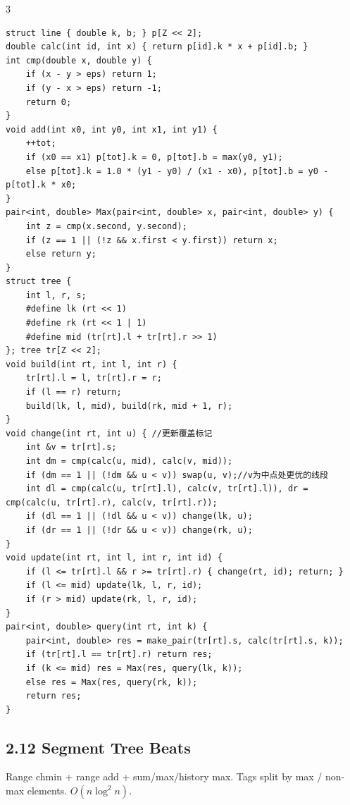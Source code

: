 \documentclass[8pt]{extarticle}
\begin{document}
\begin{multicols*}{3}
\begin{lstlisting}
struct line { double k, b; } p[Z << 2];
double calc(int id, int x) { return p[id].k * x + p[id].b; }
int cmp(double x, double y) {
    if (x - y > eps) return 1;
    if (y - x > eps) return -1;
    return 0;
}
void add(int x0, int y0, int x1, int y1) {
    ++tot;
    if (x0 == x1) p[tot].k = 0, p[tot].b = max(y0, y1);
    else p[tot].k = 1.0 * (y1 - y0) / (x1 - x0), p[tot].b = y0 - p[tot].k * x0;
}
pair<int, double> Max(pair<int, double> x, pair<int, double> y) {
    int z = cmp(x.second, y.second);
    if (z == 1 || (!z && x.first < y.first)) return x;
    else return y;
}
struct tree {
    int l, r, s;
    #define lk (rt << 1)
    #define rk (rt << 1 | 1)
    #define mid (tr[rt].l + tr[rt].r >> 1)
}; tree tr[Z << 2];
void build(int rt, int l, int r) {
    tr[rt].l = l, tr[rt].r = r;
    if (l == r) return;
    build(lk, l, mid), build(rk, mid + 1, r);
}
void change(int rt, int u) { //更新覆盖标记
    int &v = tr[rt].s;
    int dm = cmp(calc(u, mid), calc(v, mid));
    if (dm == 1 || (!dm && u < v)) swap(u, v);//v为中点处更优的线段
    int dl = cmp(calc(u, tr[rt].l), calc(v, tr[rt].l)), dr = cmp(calc(u, tr[rt].r), calc(v, tr[rt].r));
    if (dl == 1 || (!dl && u < v)) change(lk, u);
    if (dr == 1 || (!dr && u < v)) change(rk, u);
}
void update(int rt, int l, int r, int id) {
    if (l <= tr[rt].l && r >= tr[rt].r) { change(rt, id); return; }
    if (l <= mid) update(lk, l, r, id);
    if (r > mid) update(rk, l, r, id);
}
pair<int, double> query(int rt, int k) {
    pair<int, double> res = make_pair(tr[rt].s, calc(tr[rt].s, k));
    if (tr[rt].l == tr[rt].r) return res;
    if (k <= mid) res = Max(res, query(lk, k));
    else res = Max(res, query(rk, k));
    return res;
}
\end{lstlisting}

\subsection*{2.12 Segment Tree Beats}

Range chmin + range add + sum/max/history max. Tags split by max / non-max elements. $O(n \log^2 n)$.



\end{multicols*}
\end{document}
